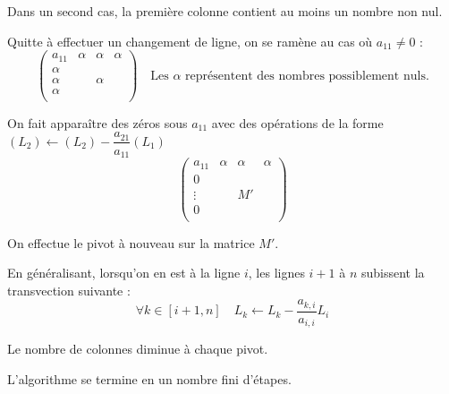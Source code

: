 \documentclass[10pt]{article}
\begin{document}
Dans un second cas, la première colonne contient au moins un nombre non nul.

 Quitte à effectuer un changement de ligne, on se ramène au cas où $a_{11}\neq 0$ :
 $$
 \left(
 \begin{array}{c|ccc}
 a_{11} & \alpha & \alpha & \alpha \\
\hline
\alpha  & & & \\
\alpha  & & \alpha & \\
\alpha  & & & \\
\end{array}
 \right) \quad 
 \text{Les } \alpha \text{ représentent des nombres possiblement nuls.}
 $$ 

 On fait apparaître des zéros sous $a_{11}$ avec des opérations de la forme $(L_2)\leftarrow (L_2)-\dfrac{a_{21}}{a_{11}}(L_1)$ 
 $$
 \left(
 \begin{array}{c|ccc}
 a_{11} & \alpha & \alpha & \alpha \\
\hline
0  & & & \\
\vdots  & & M'& \\
0  & & & \\
\end{array}
 \right) 
 $$ 
 
 On effectue le pivot  à nouveau sur la matrice $M'$.
 
 En généralisant, lorsqu'on en est à la ligne $i$, les lignes $i+1$ à $n$ subissent la transvection suivante : 
 $$
 \forall k \in[i+1,n] \quad L_{k}\leftarrow L_k - \dfrac{a_{k,i}}{a_{i,i}}L_i
 $$
 
 \begin{rem}
 Le nombre de colonnes diminue à chaque pivot.
 
 L'algorithme se termine en un nombre fini d'étapes.
 \end{rem}
\end{document}
